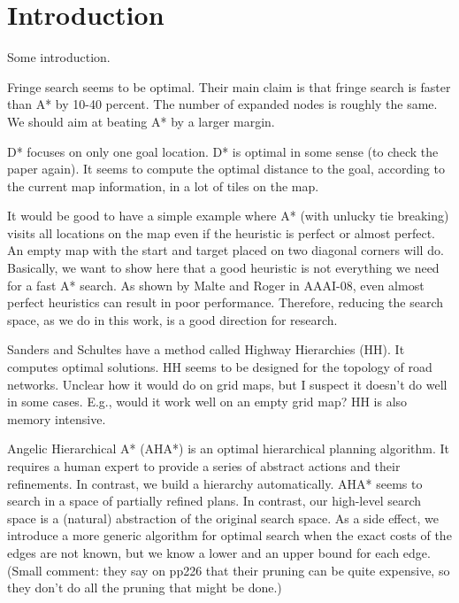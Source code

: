 
\section{Introduction}
\label{introduction}

Some introduction.

Fringe search seems to be optimal. Their main claim is that fringe search is faster than A* by 10-40 percent. The number of expanded nodes is roughly the same. We should aim at beating A* by a larger margin.

D* focuses on only one goal location. D* is optimal in some sense (to check the paper again).
It seems to compute the optimal distance to the goal, according to the current map information,
in a lot of tiles on the map.

It would be good to have a simple example where A* (with unlucky tie breaking) visits all locations on the map even if the heuristic is perfect or almost perfect. An empty map with the start and target placed on two diagonal corners will do. Basically, we want to show here that a good heuristic is not everything we need for a fast A* search. As shown by Malte and Roger in AAAI-08, even almost perfect heuristics can result in poor performance. Therefore, reducing the search space, as we do in this work, is a good direction for research.

Sanders and Schultes have a method called Highway Hierarchies (HH). It computes optimal solutions. 
HH seems to be designed for the topology of road networks. Unclear how it would do on grid maps, but I suspect it doesn't do well in some cases. E.g., would it work well on an empty grid map? HH is also memory intensive.

Angelic Hierarchical A* (AHA*) is an optimal hierarchical planning algorithm.
It requires a human expert to provide a series of abstract actions and their refinements.
In contrast, we build a hierarchy automatically.
AHA* seems to search in a space of partially refined plans. 
In contrast, our high-level search space is a (natural) abstraction of the original search space.
As a side effect, we introduce a more generic algorithm for optimal search when the exact costs of the edges are not known, but we know a lower and an upper bound for each edge.
(Small comment: they say on pp226 that their pruning can be quite expensive, so they don't do all the pruning that might be done.)
